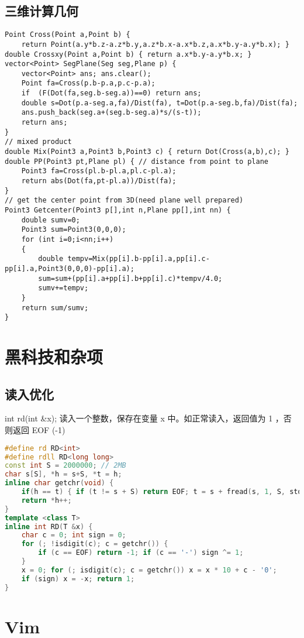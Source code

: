 \documentclass{article}
\begin{document}
\subsection{三维计算几何}
\begin{lstlisting}
Point Cross(Point a,Point b) {
	return Point(a.y*b.z-a.z*b.y,a.z*b.x-a.x*b.z,a.x*b.y-a.y*b.x); }
double Crossxy(Point a,Point b) { return a.x*b.y-a.y*b.x; }
vector<Point> SegPlane(Seg seg,Plane p) {
	vector<Point> ans; ans.clear();
	Point fa=Cross(p.b-p.a,p.c-p.a);
	if  (F(Dot(fa,seg.b-seg.a))==0) return ans;
	double s=Dot(p.a-seg.a,fa)/Dist(fa), t=Dot(p.a-seg.b,fa)/Dist(fa);
	ans.push_back(seg.a+(seg.b-seg.a)*s/(s-t));
	return ans;
}
// mixed product
double Mix(Point3 a,Point3 b,Point3 c) { return Dot(Cross(a,b),c); }
double PP(Point3 pt,Plane pl) { // distance from point to plane
	Point3 fa=Cross(pl.b-pl.a,pl.c-pl.a);
	return abs(Dot(fa,pt-pl.a))/Dist(fa);
}
// get the center point from 3D(need plane well prepared)
Point3 Getcenter(Point3 p[],int n,Plane pp[],int nn) {
	double sumv=0;
	Point3 sum=Point3(0,0,0);
	for (int i=0;i<nn;i++)
	{
		double tempv=Mix(pp[i].b-pp[i].a,pp[i].c-pp[i].a,Point3(0,0,0)-pp[i].a);
		sum=sum+(pp[i].a+pp[i].b+pp[i].c)*tempv/4.0;
		sumv+=tempv;
	}
	return sum/sumv;
}
\end{lstlisting}

\section{黑科技和杂项}

\subsection{读入优化}

int rd(int \&x); 读入一个整数，保存在变量 x 中。如正常读入，返回值为 1 ，否则返回 EOF (-1)

\begin{lstlisting}[language=C++]
#define rd RD<int>
#define rdll RD<long long>
const int S = 2000000; // 2MB
char s[S], *h = s+S, *t = h;
inline char getchr(void) {
	if(h == t) { if (t != s + S) return EOF; t = s + fread(s, 1, S, stdin); h = s; }
	return *h++;
}
template <class T>
inline int RD(T &x) {
	char c = 0; int sign = 0;
	for (; !isdigit(c); c = getchr()) {
		if (c == EOF) return -1; if (c == '-') sign ^= 1;
	}
	x = 0; for (; isdigit(c); c = getchr()) x = x * 10 + c - '0';
	if (sign) x = -x; return 1;
}
\end{lstlisting}

\section{Vim}
\end{document}
